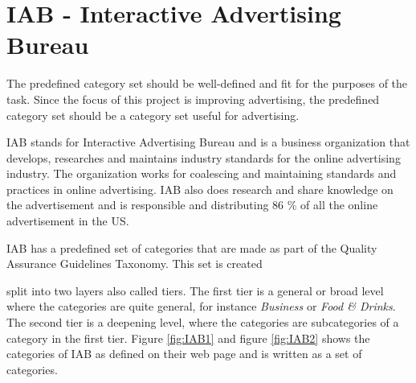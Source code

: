 \section{IAB - Interactive Advertising Bureau}
The predefined category set should be well-defined and fit for the purposes of the task. Since the focus of this project is improving advertising, the predefined category set should be a category set useful for advertising. 




IAB stands for Interactive Advertising Bureau and is a business organization that develops, researches and maintains industry standards for the online advertising industry. The organization works for coalescing and maintaining standards and practices in online advertising. IAB also does research and share knowledge on the advertisement and is responsible and distributing 86 \% of all the online advertisement in the US. \cite{IABabout}

IAB has a predefined set of categories that are made as part of the Quality Assurance Guidelines Taxonomy. This set is created 


split into two layers also called tiers. The first tier is a general or broad level where the categories are quite general, for instance \textit{Business} or \textit{Food \& Drinks}. The second tier is a deepening level, where the categories are subcategories of a category in the first tier.
Figure \ref{fig:IAB1} and figure \ref{fig:IAB2}
shows the categories of IAB as defined on their web page and is written as a set of categories. 






